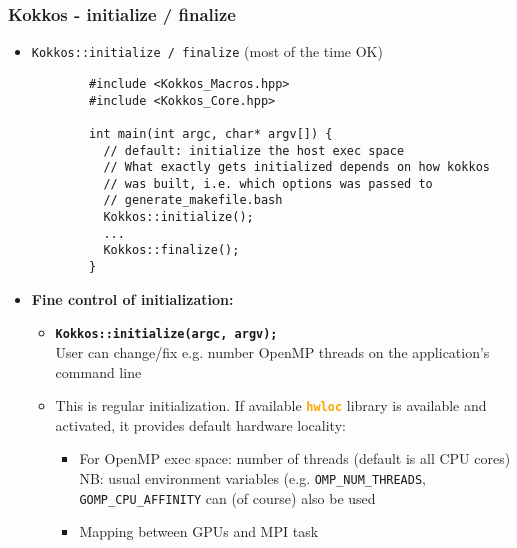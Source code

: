 \begin{frame}[fragile=singleslide]
  \frametitle{Kokkos - initialize / finalize}

  \begin{itemize}
  \item \texttt{Kokkos::initialize / finalize} (most of the time OK)
    {\small\begin{verbatim}
        #include <Kokkos_Macros.hpp>
        #include <Kokkos_Core.hpp>

        int main(int argc, char* argv[]) {
          // default: initialize the host exec space
          // What exactly gets initialized depends on how kokkos
          // was built, i.e. which options was passed to
          // generate_makefile.bash
          Kokkos::initialize();
          ...
          Kokkos::finalize();
        }
      \end{verbatim}
    }
  \item \textbf{Fine control of initialization:}
    \begin{itemize}
    \item \texttt{\bf Kokkos::initialize(argc, argv);}\\
      User can change/fix e.g. number OpenMP threads on the application's command line
    \item This is regular initialization. If available \textcolor{orange}{\textbf{\texttt{hwloc}}} library is available and activated, it provides default hardware locality:
      \begin{itemize}
      \item For OpenMP exec space: number of threads (default is all CPU cores)\\
        NB: usual environment variables (e.g. \texttt{OMP\_NUM\_THREADS}, \texttt{GOMP\_CPU\_AFFINITY} can (of course) also be used
      \item Mapping between GPUs and MPI task
      \end{itemize}
    \end{itemize}
  \end{itemize}

\end{frame}



